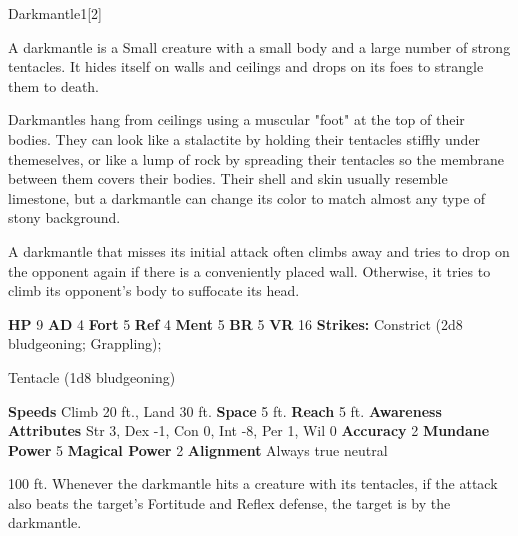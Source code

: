   \begin{monsection}{Darkmantle}{1}[2]
    \vspace{-1em}\vspace{-1em}
    \vspace{0em}

    
        A darkmantle is a Small creature with a small body and a large number of strong tentacles.
        It hides itself on walls and ceilings and drops on its foes to strangle them to death.
      
        Darkmantles hang from ceilings using a muscular "foot" at the top of their bodies.
        They can look like a stalactite by holding their tentacles stiffly under themeselves, or like a lump of rock by spreading their tentacles so the membrane between them covers their bodies.
        Their shell and skin usually resemble limestone, but a darkmantle can change its color to match almost any type of stony background.
      
        A darkmantle that misses its initial attack often climbs away and tries to drop on the opponent again if there is a conveniently placed wall.
        Otherwise, it tries to climb its opponent's body to suffocate its head.
      

    \begin{spellcontent}
      \begin{spelltargetinginfo}
        \pari \textbf{HP} 9 \monsep
          \textbf{AD} 4 \monsep
          \textbf{Fort} 5 \monsep
          \textbf{Ref} 4 \monsep
          \textbf{Ment} 5
        \pari \textbf{BR} 5 \monsep
        \textbf{VR} 16
        \pari \textbf{Strikes:}
            Constrict  (2d8 bludgeoning; Grappling);
\par Tentacle  (1d8 bludgeoning)
      \end{spelltargetinginfo}
    \end{spellcontent}
    \begin{monsterfooter}
      \pari \textbf{Speeds} Climb 20 ft., Land 30 ft. \monsep
        \textbf{Space} 5 ft. \monsep
        \textbf{Reach} 5 ft.
      \pari \textbf{Awareness} 
      \pari \textbf{Attributes}
        Str 3, Dex -1,
        Con 0, Int -8,
        Per 1, Wil 0
      \pari \textbf{Accuracy} 2 \monsep
        \textbf{Mundane Power} 5 \monsep
      \textbf{Magical Power} 2
      \pari \textbf{Alignment} Always true neutral
    \end{monsterfooter}
  \end{monsection}
   100 ft.
          Whenever the darkmantle hits a creature with its tentacles, if the attack also beats the target's Fortitude and Reflex defense,
          the target is  by the darkmantle.
  
